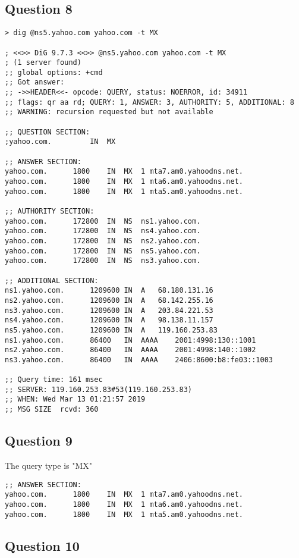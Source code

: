 \documentclass{article}
\begin{document}
\subsection{Question 8}

\begin{lstlisting}
> dig @ns5.yahoo.com yahoo.com -t MX

; <<>> DiG 9.7.3 <<>> @ns5.yahoo.com yahoo.com -t MX
; (1 server found)
;; global options: +cmd
;; Got answer:
;; ->>HEADER<<- opcode: QUERY, status: NOERROR, id: 34911
;; flags: qr aa rd; QUERY: 1, ANSWER: 3, AUTHORITY: 5, ADDITIONAL: 8
;; WARNING: recursion requested but not available

;; QUESTION SECTION:
;yahoo.com.			IN	MX

;; ANSWER SECTION:
yahoo.com.		1800	IN	MX	1 mta7.am0.yahoodns.net.
yahoo.com.		1800	IN	MX	1 mta6.am0.yahoodns.net.
yahoo.com.		1800	IN	MX	1 mta5.am0.yahoodns.net.

;; AUTHORITY SECTION:
yahoo.com.		172800	IN	NS	ns1.yahoo.com.
yahoo.com.		172800	IN	NS	ns4.yahoo.com.
yahoo.com.		172800	IN	NS	ns2.yahoo.com.
yahoo.com.		172800	IN	NS	ns5.yahoo.com.
yahoo.com.		172800	IN	NS	ns3.yahoo.com.

;; ADDITIONAL SECTION:
ns1.yahoo.com.		1209600	IN	A	68.180.131.16
ns2.yahoo.com.		1209600	IN	A	68.142.255.16
ns3.yahoo.com.		1209600	IN	A	203.84.221.53
ns4.yahoo.com.		1209600	IN	A	98.138.11.157
ns5.yahoo.com.		1209600	IN	A	119.160.253.83
ns1.yahoo.com.		86400	IN	AAAA	2001:4998:130::1001
ns2.yahoo.com.		86400	IN	AAAA	2001:4998:140::1002
ns3.yahoo.com.		86400	IN	AAAA	2406:8600:b8:fe03::1003

;; Query time: 161 msec
;; SERVER: 119.160.253.83#53(119.160.253.83)
;; WHEN: Wed Mar 13 01:21:57 2019
;; MSG SIZE  rcvd: 360

\end{lstlisting}

\subsection{Question 9}

The query type is "MX"

\begin{lstlisting}
;; ANSWER SECTION:
yahoo.com.		1800	IN	MX	1 mta7.am0.yahoodns.net.
yahoo.com.		1800	IN	MX	1 mta6.am0.yahoodns.net.
yahoo.com.		1800	IN	MX	1 mta5.am0.yahoodns.net.
\end{lstlisting}

\subsection{Question 10}
\end{document}
